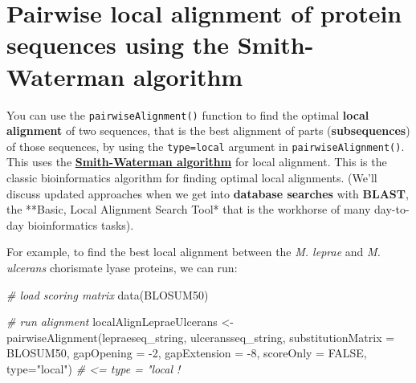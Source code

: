 \documentclass[
]{book}
\newenvironment{Shaded}{\begin{snugshade}}{\end{snugshade}}
\newcommand{\AttributeTok}[1]{\textcolor[rgb]{0.77,0.63,0.00}{#1}}
\newcommand{\CommentTok}[1]{\textcolor[rgb]{0.56,0.35,0.01}{\textit{#1}}}
\newcommand{\ConstantTok}[1]{\textcolor[rgb]{0.00,0.00,0.00}{#1}}
\newcommand{\DecValTok}[1]{\textcolor[rgb]{0.00,0.00,0.81}{#1}}
\newcommand{\FunctionTok}[1]{\textcolor[rgb]{0.00,0.00,0.00}{#1}}
\newcommand{\NormalTok}[1]{#1}
\newcommand{\OtherTok}[1]{\textcolor[rgb]{0.56,0.35,0.01}{#1}}
\newcommand{\SpecialCharTok}[1]{\textcolor[rgb]{0.00,0.00,0.00}{#1}}
\newcommand{\StringTok}[1]{\textcolor[rgb]{0.31,0.60,0.02}{#1}}
\begin{document}
\hypertarget{pairwise-local-alignment-of-protein-sequences-using-the-smith-waterman-algorithm}{%
\section{Pairwise local alignment of protein sequences using the Smith-Waterman algorithm}\label{pairwise-local-alignment-of-protein-sequences-using-the-smith-waterman-algorithm}}

You can use the \texttt{pairwiseAlignment()} function to find the optimal \textbf{local alignment} of two sequences, that is the best alignment of parts (\textbf{subsequences}) of those sequences, by using the \texttt{type=local} argument in \texttt{pairwiseAlignment()}. This uses the \textbf{\href{https://en.wikipedia.org/wiki/Smith\%E2\%80\%93Waterman_algorithm}{Smith-Waterman algorithm}} for local alignment. This is the classic bioinformatics algorithm for finding optimal local alignments. (We'll discuss updated approaches when we get into \textbf{database searches} with \textbf{BLAST}, the **Basic, Local Alignment Search Tool* that is the workhorse of many day-to-day bioinformatics tasks).

For example, to find the best local alignment between the \emph{M. leprae} and \emph{M. ulcerans} chorismate lyase proteins, we can run:

\begin{Shaded}
\begin{Highlighting}[]
\CommentTok{\# load scoring matrix}
\FunctionTok{data}\NormalTok{(BLOSUM50)}

\CommentTok{\# run alignment}
\NormalTok{localAlignLepraeUlcerans }\OtherTok{\textless{}{-}} \FunctionTok{pairwiseAlignment}\NormalTok{(lepraeseq\_string, }
\NormalTok{                                              ulceransseq\_string,}
                                              \AttributeTok{substitutionMatrix =}\NormalTok{ BLOSUM50, }
                                              \AttributeTok{gapOpening =} \SpecialCharTok{{-}}\DecValTok{2}\NormalTok{, }
                                              \AttributeTok{gapExtension =} \SpecialCharTok{{-}}\DecValTok{8}\NormalTok{, }
                                              \AttributeTok{scoreOnly =} \ConstantTok{FALSE}\NormalTok{, }
                                              \AttributeTok{type=}\StringTok{"local"}\NormalTok{)  }\CommentTok{\# \textless{}= type = "local !}
\end{Highlighting}
\end{Shaded}
\end{document}
